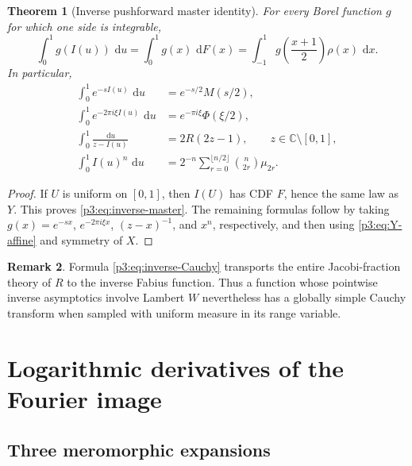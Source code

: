 \documentclass[11pt,oneside]{article}
\newtheorem{theorem}{Theorem}[section]
\theoremstyle{definition}
\newtheorem{remark}[theorem]{Remark}
\newcommand{\dd}{\,\mathrm d}
\newcommand{\C}{\mathbb C}
\begin{document}
\begin{theorem}[Inverse pushforward master identity]\label{p3:thm:inverse-pushforward}
For every Borel function \(g\) for which one side is integrable,
\begin{equation}
 \boxed{
 \int_0^1g(I(u))\,\dd u
 =\int_0^1g(x)\,\dd F(x)
 =\int_{-1}^{1}g\!\left(\frac{x+1}{2}\right)\rho(x)\,\dd x.
 }                                                           \label{p3:eq:inverse-master}
\end{equation}
In particular,
\begin{align}
 \int_0^1 e^{-sI(u)}\,\dd u
 &=e^{-s/2}M(s/2),                                           \label{p3:eq:inverse-Laplace}\\
 \int_0^1 e^{-2\pi i\xi I(u)}\,\dd u
 &=e^{-\pi i\xi}\Phi(\xi/2),                              \label{p3:eq:inverse-Fourier}\\
 \int_0^1\frac{\dd u}{z-I(u)}
 &=2R(2z-1),\qquad z\in\C\setminus[0,1],                   \label{p3:eq:inverse-Cauchy}\\
 \int_0^1I(u)^n\,\dd u
 &=2^{-n}\sum_{r=0}^{\lfloor n/2\rfloor}
   \binom{n}{2r}\mu_{2r}.                                   \label{p3:eq:inverse-moments}
\end{align}
\end{theorem}

\begin{proof}
If \(U\) is uniform on \([0,1]\), then \(I(U)\) has CDF \(F\), hence the same law as
\(Y\).  This proves \eqref{p3:eq:inverse-master}.  The remaining formulas follow by taking
\(g(x)=e^{-sx}\), \(e^{-2\pi i\xi x}\), \((z-x)^{-1}\), and \(x^n\), respectively,
and then using \eqref{p3:eq:Y-affine} and symmetry of \(X\).
\end{proof}

\begin{remark}
Formula \eqref{p3:eq:inverse-Cauchy} transports the entire Jacobi-fraction theory of \(R\) to
the inverse Fabius function.  Thus a function whose pointwise inverse asymptotics involve
Lambert \(W\) nevertheless has a globally simple Cauchy transform when sampled with
uniform measure in its range variable.
\end{remark}

\section{Logarithmic derivatives of the Fourier image}

\subsection{Three meromorphic expansions}
\end{document}
